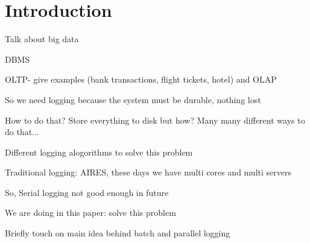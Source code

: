 \section{Introduction}

  Talk about big data

  DBMS

  OLTP- give examples (bank transactions, flight tickets, hotel) and OLAP

  So we need logging because the system must be durable, nothing lost

  How to do that? Store everything to disk but how? Many many different ways to do that...

  Different logging alogorithms to solve this problem

  Traditional logging: AIRES, these days we have multi cores and multi servers

  So,  Serial logging not good enough in future

  We are doing in this paper: solve this problem

  Briefly touch on main idea behind batch and parallel logging


  
